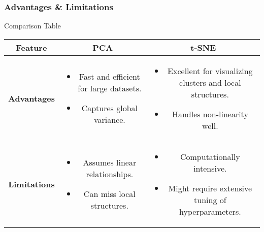\documentclass[aspectratio=169]{beamer}
\begin{document}
\begin{frame}[fragile]
    \frametitle{Advantages \& Limitations}
    \begin{block}{Comparison Table}
        \begin{tabular}{|c|c|c|}
            \hline
            Feature & PCA & t-SNE \\
            \hline
            \textbf{Advantages} & 
            \begin{itemize}
                \item Fast and efficient for large datasets.
                \item Captures global variance.
            \end{itemize} &
            \begin{itemize}
                \item Excellent for visualizing clusters and local structures.
                \item Handles non-linearity well.
            \end{itemize} \\ 
            \hline
            \textbf{Limitations} & 
            \begin{itemize}
                \item Assumes linear relationships.
                \item Can miss local structures.
            \end{itemize} & 
            \begin{itemize}
                \item Computationally intensive.
                \item Might require extensive tuning of hyperparameters.
            \end{itemize} \\ 
            \hline
        \end{tabular}
    \end{block}
\end{frame}
\end{document}
